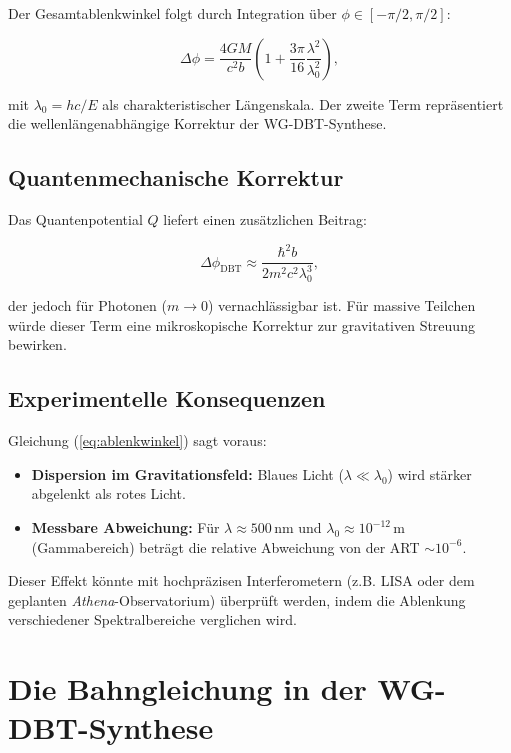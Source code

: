 Der Gesamtablenkwinkel folgt durch Integration über $\phi \in [-\pi/2, \pi/2]$:

\begin{equation}
\Delta \phi = \frac{4GM}{c^2 b} \left(1 + \frac{3\pi}{16} \frac{\lambda^2}{\lambda_0^2}\right),
\label{eq:ablenkwinkel}
\end{equation}

mit $\lambda_0 = hc/E$ als charakteristischer Längenskala. Der zweite Term repräsentiert die wellenlängenabhängige Korrektur der WG-DBT-Synthese.

\subsection{Quantenmechanische Korrektur}
Das Quantenpotential $Q$ liefert einen zusätzlichen Beitrag:

\begin{equation}
\Delta \phi_{\text{DBT}} \approx \frac{\hbar^2 b}{2m^2 c^2 \lambda_0^3},
\end{equation}

der jedoch für Photonen ($m \to 0$) vernachlässigbar ist. Für massive Teilchen würde dieser Term eine mikroskopische Korrektur zur gravitativen Streuung bewirken.

\subsection{Experimentelle Konsequenzen}
Gleichung (\ref{eq:ablenkwinkel}) sagt voraus:
\begin{itemize}
\item \textbf{Dispersion im Gravitationsfeld:} Blaues Licht ($\lambda \ll \lambda_0$) wird stärker abgelenkt als rotes Licht.
\item \textbf{Messbare Abweichung:} Für $\lambda \approx 500\,\text{nm}$ und $\lambda_0 \approx 10^{-12}\,\text{m}$ (Gammabereich) beträgt die relative Abweichung von der ART $\sim 10^{-6}$.
\end{itemize}

Dieser Effekt könnte mit hochpräzisen Interferometern (z.B. LISA oder dem geplanten \textit{Athena}-Observatorium) überprüft werden, indem die Ablenkung verschiedener
Spektralbereiche verglichen wird.

\newpage
\section{Die Bahngleichung in der WG-DBT-Synthese}
\label{sec:bahn_alpha}

